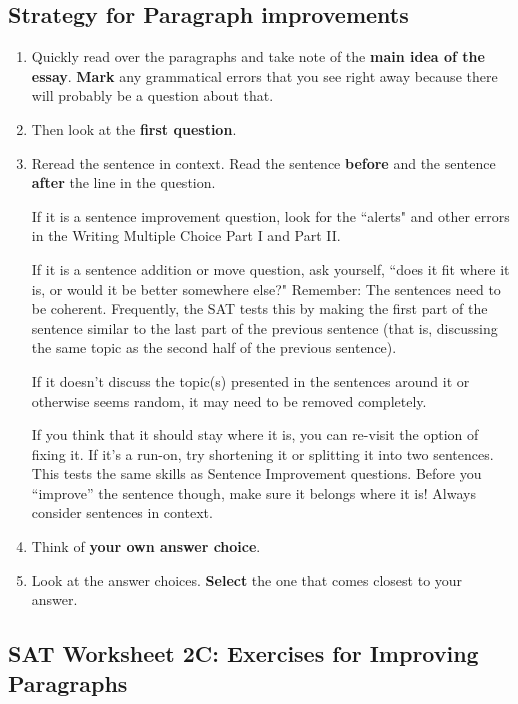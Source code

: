 \begin{enumerate}
\begin{itemize}

\subsection{Strategy for Paragraph improvements}

\begin{enumerate}
\item Quickly read over the paragraphs and take note of the \textbf{main idea of the essay}. \textbf{Mark} any grammatical errors that you see right away because there will probably be a question about that.
\item Then look at the \textbf{first question}.  
\item Reread the sentence in context. Read the sentence \textbf{before} and the sentence \textbf{after} the line in the question. 

If it is a sentence improvement question, look for the ``alerts" and other errors in the Writing Multiple Choice Part I and Part II. 

If it is a sentence addition or move question, ask yourself, ``does it fit where it is, or would it be better somewhere else?" Remember: The sentences need to be coherent. Frequently, the SAT tests this by making the first part of the sentence similar to the last part of the previous sentence (that is, discussing the same topic as the second half of the previous sentence). 

If it doesn't discuss the topic(s) presented in the sentences around it or otherwise seems random, it may need to be removed completely. 

If you think that it should stay where it is, you can re-visit the option of fixing it.  If it's a run-on, try shortening it or splitting it into two sentences.  This tests the same skills as Sentence Improvement questions.  Before you “improve” the sentence though, make sure it belongs where it is!  Always consider sentences in context.

\item Think of \textbf{your own answer choice}.
\item Look at the answer choices.  \textbf{Select} the one that comes closest to your answer.
\end{enumerate}



\subsection{SAT Worksheet 2C: Exercises for Improving Paragraphs}


\end{itemize}
\end{enumerate}
